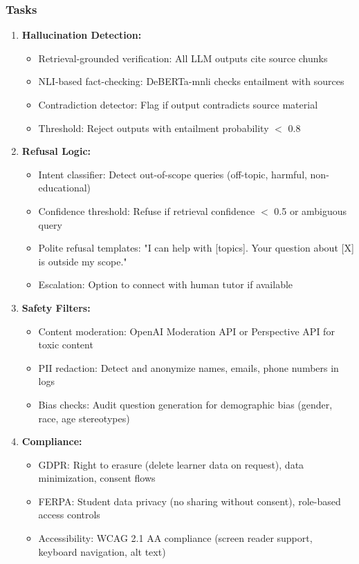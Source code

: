 \documentclass[11pt,letterpaper]{article}
\begin{document}
\subsubsection{Tasks}
\begin{enumerate}
\item \textbf{Hallucination Detection:}
\begin{itemize}
\item Retrieval-grounded verification: All LLM outputs cite source chunks
\item NLI-based fact-checking: DeBERTa-mnli checks entailment with sources
\item Contradiction detector: Flag if output contradicts source material
\item Threshold: Reject outputs with entailment probability $<$ 0.8
\end{itemize}

\item \textbf{Refusal Logic:}
\begin{itemize}
\item Intent classifier: Detect out-of-scope queries (off-topic, harmful, non-educational)
\item Confidence threshold: Refuse if retrieval confidence $<$ 0.5 or ambiguous query
\item Polite refusal templates: "I can help with [topics]. Your question about [X] is outside my scope."
\item Escalation: Option to connect with human tutor if available
\end{itemize}

\item \textbf{Safety Filters:}
\begin{itemize}
\item Content moderation: OpenAI Moderation API or Perspective API for toxic content
\item PII redaction: Detect and anonymize names, emails, phone numbers in logs
\item Bias checks: Audit question generation for demographic bias (gender, race, age stereotypes)
\end{itemize}

\item \textbf{Compliance:}
\begin{itemize}
\item GDPR: Right to erasure (delete learner data on request), data minimization, consent flows
\item FERPA: Student data privacy (no sharing without consent), role-based access controls
\item Accessibility: WCAG 2.1 AA compliance (screen reader support, keyboard navigation, alt text)
\end{itemize}


\end{enumerate}
\end{document}
